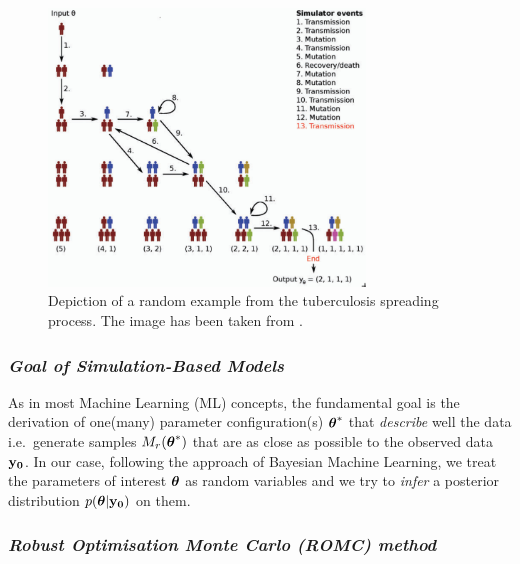 \begin{figure}[!ht]
    \begin{center}
      \includegraphics[width=0.75\textwidth]{./Thesis/images/chapter1/tuber_model_1.png}
    \end{center}
    \caption{Depiction of a random example from the tuberculosis
      spreading process. The image has been taken from
      \autocite{Lintusaari2017}.}
    \label{fig:tuberculosis_model}
\end{figure}

\subsubsection*{\textit{Goal of Simulation-Based Models}}

As in most Machine Learning (ML) concepts, the fundamental goal is the
derivation of one(many) parameter configuration(s) $\boldsymbol{\theta}^*$ that
\textit{describe} well the data i.e.\ generate samples
$M_r(\boldsymbol{\theta}^*)$ that are as close as possible to the observed data
$\mathbf{y_0}$. In our case, following the approach of Bayesian Machine
Learning, we treat the parameters of interest $\boldsymbol{\theta}$ as random
variables and we try to \textit{infer} a posterior distribution
$p(\boldsymbol{\theta}|\mathbf{y_0})$ on them. 

\subsubsection*{\textit{Robust Optimisation Monte Carlo (ROMC) method}}

